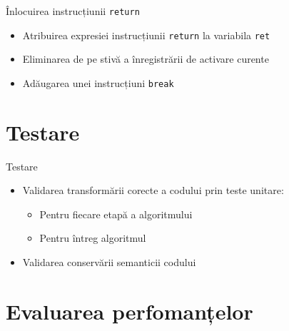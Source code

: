 \documentclass{beamer}
\def\code#1{\texttt{#1}}
\begin{document}
\begin{frame}{Înlocuirea instrucțiunii \code{return}}
    \begin{itemize}
        \item Atribuirea expresiei instrucțiunii \code{return} la variabila \code{ret}
        \item Eliminarea de pe stivă a înregistrării de activare curente
        \item Adăugarea unei instrucțiuni \code{break}
\end{itemize}
\end{frame}

\section{Testare}

\begin{frame}{Testare}
    \begin{itemize}
        \item Validarea transformării corecte a codului prin teste unitare:
        \begin{itemize}
            \item Pentru fiecare etapă a algoritmului
            \item Pentru întreg algoritmul
        \end{itemize}
        \item Validarea conservării semanticii codului
    \end{itemize}
\end{frame}
	
\section{Evaluarea perfomanțelor}
\end{document}
